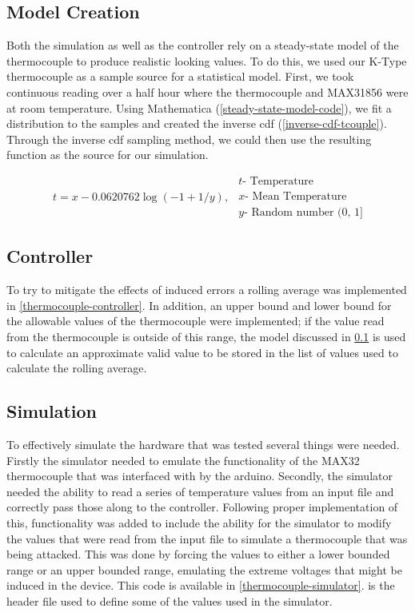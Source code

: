 \subsection{Model Creation}\label{model-creation}
Both the simulation as well as the controller rely on a steady-state model of the thermocouple to produce realistic looking values. To do this, we used our K-Type thermocouple as a sample source for a statistical model. First, we took continuous reading over a half hour where the thermocouple and MAX31856 were at room temperature. Using Mathematica (\cref{steady-state-model-code}), we fit a distribution to the samples and created the inverse \ac{cdf} (\cref{inverse-cdf-tcouple}). Through the inverse \ac{cdf} sampling method, we could then use the resulting function as the source for our simulation. 

\begin{equation}\label{inverse-cdf-tcouple}
\begin{split}
t = x - 0.0620762 \log({-1 + 1/y}),
\end{split}
\begin{split}
t \text{- Temperature}\\
x \text{- Mean Temperature}\\
y \text{- Random number (0, 1]}
\end{split}
\end{equation}

\subsection{Controller}
To try to mitigate the effects of induced errors a rolling average was implemented in \cref{thermocouple-controller}. In addition, an upper bound and lower bound for the allowable values of the thermocouple were implemented; if the value read from the thermocouple is outside of this range, the model discussed in \cref{model-creation} is used to calculate an approximate valid value to be stored in the list of values used to calculate the rolling average.

\subsection{Simulation}
To effectively simulate the hardware that was tested several things were needed. Firstly the simulator needed to emulate the functionality of the MAX32 thermocouple that was interfaced with by the arduino. Secondly, the simulator needed the ability to read a series of temperature values from an input file and correctly pass those along to the controller. Following proper implementation of this, functionality was added to include the ability for the simulator to modify the values that were read from the input file to simulate a thermocouple that was being attacked. This was done by forcing the values to either a lower bounded range or an upper bounded range, emulating the extreme voltages that might be induced in the device. This code is available in \cref{thermocouple-simulator}.  is the header file used to define some of the values used in the simulator.

